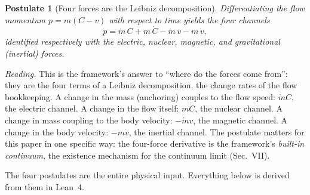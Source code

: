 \documentclass[aps,prd,preprint,superscriptaddress,amsmath,amssymb]{revtex4-2}
\newtheorem{postulate}{Postulate}[section]
\begin{document}
\begin{postulate}[Four forces are the Leibniz decomposition]
\label{post:forces}
Differentiating the flow momentum $p=m(C-v)$ with respect to time
yields the four channels
\begin{equation}
\dot p = \dot m\,C + m\,\dot C - \dot m\,v - m\,\dot v,
\label{eq:fourforce}
\end{equation}
identified respectively with the electric, nuclear, magnetic, and
gravitational (inertial) forces.
\end{postulate}

\emph{Reading.}  This is the framework's answer to ``where do the
forces come from'': they are the four terms of a Leibniz
decomposition, the change rates of the flow bookkeeping.  A change
in the mass (anchoring) couples to the flow speed: $\dot m C$, the
electric channel.  A change in the flow itself: $m\dot C$, the
nuclear channel.  A change in mass coupling to the body velocity:
$-\dot m v$, the magnetic channel.  A change in the body velocity:
$-m\dot v$, the inertial channel.  The postulate matters for this
paper in one specific way: the four-force derivative is the
framework's \emph{built-in continuum}, the existence mechanism for
the continuum limit (Sec.~VII).

The four postulates are the entire physical input.  Everything
below is derived from them in Lean~4.
\end{document}
